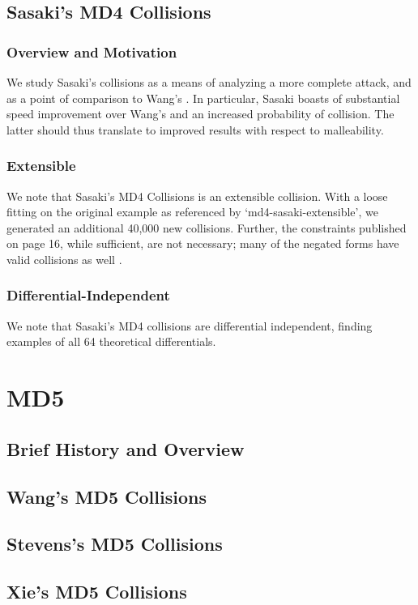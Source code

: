\documentclass[letterpaper,twocolumn,10pt]{article}
\begin{document}
\subsection{Sasaki's MD4 Collisions}
\subsubsection{Overview and Motivation}
We study Sasaki's collisions as a means of analyzing a more complete attack,
and as a point of comparison to Wang's \cite{Sasaki2007}. In particular, Sasaki boasts
of substantial speed improvement over Wang's and an increased probability of
collision. The latter should thus translate to improved results with respect to
malleability.

\subsubsection{Extensible}
We note that Sasaki's MD4 Collisions is an extensible collision. With a loose
fitting on the original example as referenced by `md4-sasaki-extensible',
we generated an additional 40,000 new collisions. Further, the constraints
published on page 16, while sufficient, are not necessary; many of the negated
forms have valid collisions as well \cite{Sasaki2007}.


\subsubsection{Differential-Independent}
We note that Sasaki's MD4 collisions are differential independent, finding
examples of all 64 theoretical differentials.

\section{MD5}
\subsection{Brief History and Overview}
\subsection{Wang's MD5 Collisions}
\subsection{Stevens's MD5 Collisions}
\subsection{Xie's MD5 Collisions}
\end{document}
